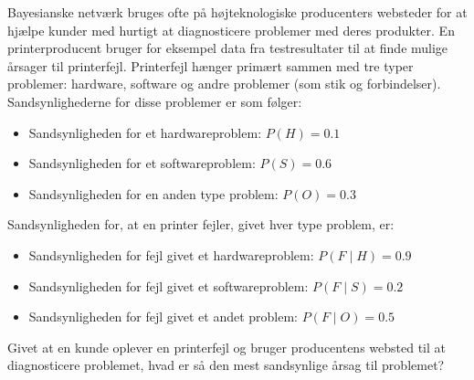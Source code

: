\begin{example}
    Bayesianske netværk bruges ofte på højteknologiske producenters websteder for at hjælpe kunder med hurtigt at diagnosticere problemer med deres produkter. En printerproducent bruger for eksempel data fra testresultater til at finde mulige årsager til printerfejl. Printerfejl hænger primært sammen med tre typer problemer: hardware, software og andre problemer (som stik og forbindelser). Sandsynlighederne for disse problemer er som følger:
\begin{itemize}
    \item Sandsynligheden for et hardwareproblem: $P(H)=0.1$
    \item Sandsynligheden for et softwareproblem: $P(S)=0.6$
    \item Sandsynligheden for en anden type problem: $P(O)=0.3$
\end{itemize}

Sandsynligheden for, at en printer fejler, givet hver type problem, er:
\begin{itemize}
    \item Sandsynligheden for fejl givet et hardwareproblem: $P(F \mid H)=0.9$
    \item Sandsynligheden for fejl givet et softwareproblem: $P(F \mid S)=0.2$
    \item Sandsynligheden for fejl givet et andet problem: $P(F \mid O)=0.5$
\end{itemize}

Givet at en kunde oplever en printerfejl og bruger producentens websted til at diagnosticere problemet, hvad er så den mest sandsynlige årsag til problemet?
\end{example}

